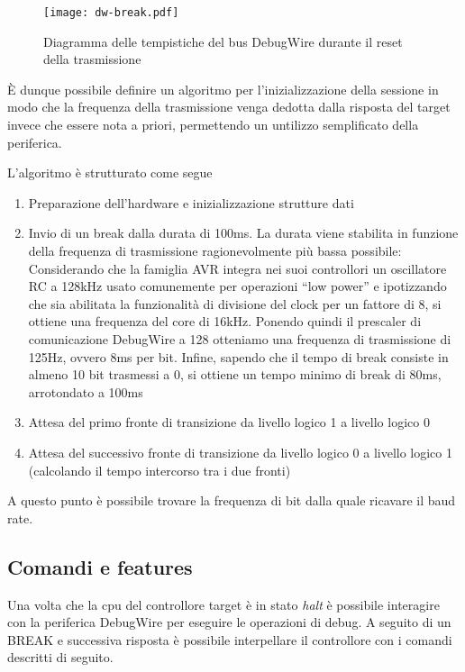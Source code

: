 \begin{figure}[ht]
    \centering
    \texttt{[image: dw-break.pdf]}
    \caption[]{Diagramma delle tempistiche del bus DebugWire durante il reset della trasmissione}\label{fig:dw-timings}
\end{figure}

È dunque possibile definire un algoritmo per l'inizializzazione della sessione in modo che la frequenza della trasmissione venga dedotta dalla risposta del target invece che essere nota a priori, permettendo un untilizzo semplificato della periferica.

L'algoritmo è strutturato come segue
\begin{enumerate}
    \item Preparazione dell'hardware e inizializzazione strutture dati
    \item Invio di un break dalla durata di 100ms. La durata viene stabilita in funzione della frequenza di trasmissione ragionevolmente più bassa possibile: Considerando che la famiglia AVR integra nei suoi controllori un oscillatore RC a 128kHz usato comunemente per operazioni ``low power'' e ipotizzando che sia abilitata la funzionalità di divisione del clock per un fattore di 8\cite[sec 9.11, tab 28-9]{avr:m328p}, si ottiene una frequenza del core di 16kHz. Ponendo quindi il prescaler di comunicazione DebugWire a 128 otteniamo una frequenza di trasmissione di 125Hz, ovvero 8ms per bit. Infine, sapendo che il tempo di break consiste in almeno 10 bit trasmessi a 0, si ottiene un tempo minimo di break di 80ms, arrotondato a 100ms
    \item Attesa del primo fronte di transizione da livello logico 1 a livello logico 0
    \item Attesa del successivo fronte di transizione da livello logico 0 a livello logico 1 (calcolando il tempo intercorso tra i due fronti)
\end{enumerate}

A questo punto è possibile trovare la frequenza di bit dalla quale ricavare il baud rate.

\subsection{Comandi e features}

Una volta che la cpu del controllore target è in stato \textit{halt} è possibile interagire con la periferica DebugWire per eseguire le operazioni di debug. A seguito di un BREAK e successiva risposta è possibile interpellare il controllore con i comandi descritti di seguito.

